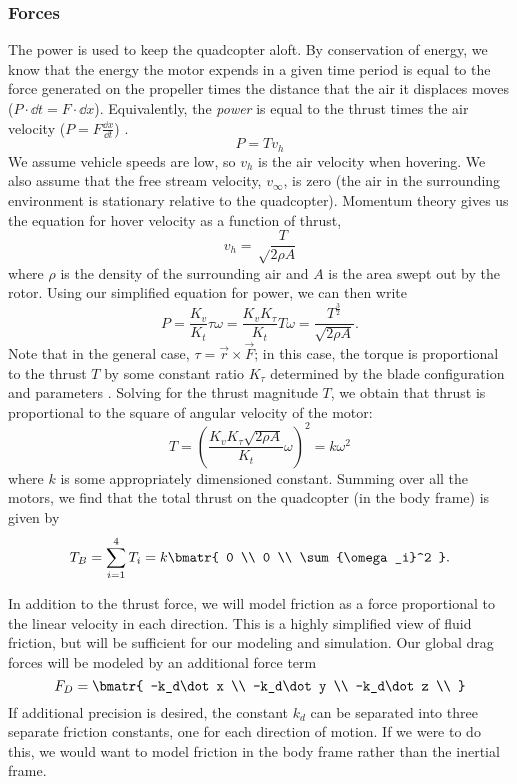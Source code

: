 \documentclass{article}
\begin{document}
\subsubsection*{Forces}
The power is used to keep the quadcopter aloft. By conservation of energy, we know that the 
energy the motor expends in a given time period is equal to the force generated on the propeller
times the distance that the air it displaces moves ($P\cdot \dd t = F \cdot \dd x$). Equivalently, the \emph{power} is equal to the
thrust times the air velocity ($P = F\frac{\dd x}{\dd t}$) \cite{hoffman}.
\[P = Tv_h\]
We assume vehicle speeds are low, so $v_h$ is the air velocity when hovering. We also assume that
the free stream velocity, $v_\infty$, is zero (the air in the surrounding environment is stationary
relative to the quadcopter). Momentum theory gives us the equation for hover
velocity as a function of thrust,
\[v_h = \sqrt\frac{T}{2\rho A}\]
where $\rho$ is the density of the surrounding air and $A$ is the area swept out by the rotor. Using
our simplified equation for power, we can then write
\[P = \frac{K_v}{K_t} \tau \omega = \frac{K_vK_\tau}{K_t} T \omega = \frac{T^\frac{3}{2}}{\sqrt{2\rho A}}.\]
Note that in the general case, $\tau = \vec r \times \vec F$; in this case, the torque is
proportional to the thrust $T$ by some constant ratio $K_\tau$ determined by the blade configuration
and parameters \cite{hoffman}. Solving for the thrust magnitude $T$, 
we obtain that thrust is proportional to the square of angular velocity of the motor:
\[T = \left(\frac{K_vK_\tau\sqrt{2 \rho A}}{K_t} \omega\right)^2 = k\omega^2\]
where $k$ is some appropriately dimensioned constant. Summing over all the motors, 
we find that the total thrust on the quadcopter (in the body frame) is given by
\[T_B = \sum_{i=1}^4 T_i = k\bmatr{ 0 \\ 0 \\ \sum {\omega_i}^2 }.\]

In addition to the thrust force, we will model friction as a force proportional to the linear
velocity in each direction. This is a highly simplified view of fluid friction, but will be
sufficient for our modeling and simulation. Our global drag forces will be modeled by an additional
force term
\[F_D = \bmatr{
    -k_d\dot x \\
    -k_d\dot y \\
    -k_d\dot z \\
}\]
If additional precision is desired, the constant $k_d$ can be separated into three separate friction
constants, one for each direction of motion. If we were to do this, we would want to model friction
in the body frame rather than the inertial frame.
\end{document}
